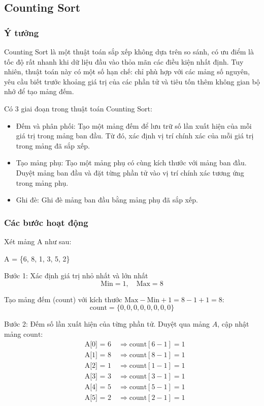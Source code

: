 \subsection{Counting Sort}

\subsubsection{Ý tưởng}
Counting Sort là một thuật toán sắp xếp không dựa trên so sánh, có ưu điểm là tốc độ rất nhanh khi dữ liệu đầu vào thỏa mãn các điều kiện nhất định. Tuy nhiên, thuật toán này có một số hạn chế: chỉ phù hợp với các mảng số nguyên, yêu cầu biết trước khoảng giá trị của các phần tử và tiêu tốn thêm không gian bộ nhớ để tạo mảng đếm.

Có 3 giai đoạn trong thuật toán Counting Sort:
\begin{itemize}
    \item Đếm và phân phối: Tạo một mảng đếm để lưu trữ số lần xuất hiện của mỗi giá trị trong mảng ban đầu. Từ đó, xác định vị trí chính xác của mỗi giá trị trong mảng đã sắp xếp.
    \item Tạo mảng phụ: Tạo một mảng phụ có cùng kích thước với mảng ban đầu. Duyệt mảng ban đầu và đặt từng phần tử vào vị trí chính xác tương ứng trong mảng phụ.
    \item Ghi đè: Ghi đè mảng ban đầu bằng mảng phụ đã sắp xếp.
\end{itemize}


\subsubsection{Các bước hoạt động}
Xét mảng A như sau: 
\begin{center}
   A = \{6, 8, 1, 3, 5, 2\} 
\end{center} 

Bước 1: Xác định giá trị nhỏ nhất và lớn nhất
\[
\text{Min} = 1, \quad \text{Max} = 8
\]

Tạo mảng đếm (\( \text{count} \)) với kích thước \( \text{Max} - \text{Min} + 1 = 8 - 1 + 1 = 8 \):
\[
\text{count} = \{0, 0, 0, 0, 0, 0, 0, 0\}
\]

Bước 2: Đếm số lần xuất hiện của từng phần tử. Duyệt qua mảng \( A \), cập nhật mảng \( \text{count} \):
\[
\begin{aligned}
&\text{A[0] = 6} \quad \Rightarrow \text{count}[6 - 1] = 1 \\
&\text{A[1] = 8} \quad \Rightarrow \text{count}[8 - 1] = 1 \\
&\text{A[2] = 1} \quad \Rightarrow \text{count}[1 - 1] = 1 \\
&\text{A[3] = 3} \quad \Rightarrow \text{count}[3 - 1] = 1 \\
&\text{A[4] = 5} \quad \Rightarrow \text{count}[5 - 1] = 1 \\
&\text{A[5] = 2} \quad \Rightarrow \text{count}[2 - 1] = 1 \\
\end{aligned}
\]

